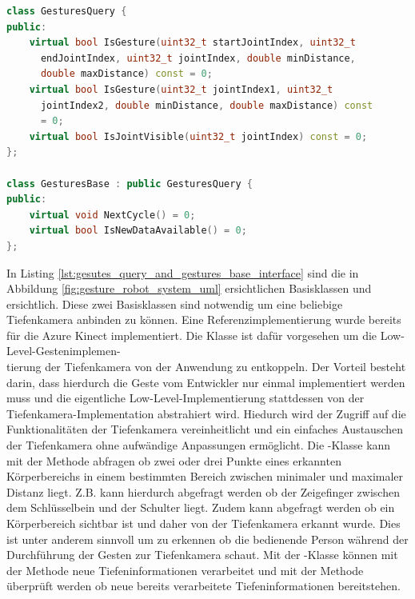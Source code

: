 \begin{lstlisting}[language=C++, caption={\quoteMark{GesturesQuery}- und \quoteMark{GesturesBase}-Programmierschnittstelle zur Anbindung einer Tiefenkamera}, label={lst:gesutes_query_and_gestures_base_interface}]
class GesturesQuery {
public:
    virtual bool IsGesture(uint32_t startJointIndex, uint32_t
      endJointIndex, uint32_t jointIndex, double minDistance,
      double maxDistance) const = 0;
    virtual bool IsGesture(uint32_t jointIndex1, uint32_t
      jointIndex2, double minDistance, double maxDistance) const
      = 0;
    virtual bool IsJointVisible(uint32_t jointIndex) const = 0;
};

class GesturesBase : public GesturesQuery {
public:
    virtual void NextCycle() = 0;
    virtual bool IsNewDataAvailable() = 0;
};
\end{lstlisting}\leavevmode\newline\vspace{-1.0em}

In Listing \ref{lst:gesutes_query_and_gestures_base_interface} sind die in Abbildung \ref{fig:gesture_robot_system_uml} ersichtlichen Basisklassen  und  ersichtlich. Diese zwei Basisklassen sind notwendig um eine beliebige Tiefenkamera anbinden zu können. Eine Referenzimplementierung wurde bereits für die Azure Kinect implementiert. Die Klasse  ist dafür vorgesehen um die Low-Level-Gestenimplemen-\\tierung der Tiefenkamera von der Anwendung zu entkoppeln. Der Vorteil besteht darin, dass hierdurch die Geste vom Entwickler nur einmal implementiert werden muss und die eigentliche Low-Level-Implementierung stattdessen von der Tiefenkamera-Implementation abstrahiert wird. Hiedurch wird der Zugriff auf die Funktionalitäten der Tiefenkamera vereinheitlicht und ein einfaches Austauschen der Tiefenkamera ohne aufwändige Anpassungen ermöglicht. Die -Klasse kann mit der Methode  abfragen ob zwei oder drei Punkte eines erkannten Körperbereichs in einem bestimmten Bereich zwischen minimaler und maximaler Distanz liegt. Z.B. kann hierdurch abgefragt werden ob der Zeigefinger zwischen dem Schlüsselbein und der Schulter liegt. Zudem kann abgefragt werden ob ein Körperbereich sichtbar ist und daher von der Tiefenkamera erkannt wurde. Dies ist unter anderem sinnvoll um zu erkennen ob die bedienende Person während der Durchführung der Gesten zur Tiefenkamera schaut. Mit der -Klasse können mit der Methode  neue Tiefeninformationen verarbeitet und mit der Methode  überprüft werden ob neue bereits verarbeitete Tiefeninformationen bereitstehen.\\

